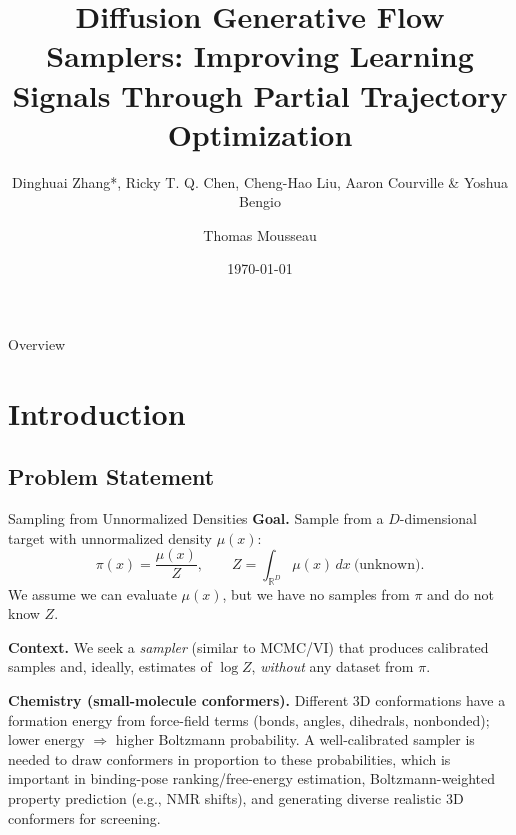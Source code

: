 \documentclass[aspectratio=169,xcolor=dvipsnames]{beamer}
\title{Diffusion Generative Flow Samplers: Improving Learning Signals Through Partial Trajectory Optimization}
\subtitle{Dinghuai Zhang*, Ricky T. Q. Chen, Cheng-Hao Liu, Aaron Courville \& Yoshua Bengio}
\author{Thomas Mousseau}
\date{\today} %
\begin{document}
\begin{frame}
    \vspace*{-2cm}
    \titlepage
\end{frame}

\begin{frame}{Overview}
    \tableofcontents
\end{frame}


\section{Introduction}

\subsection{Problem Statement}

\begin{frame}[t]{Sampling from Unnormalized Densities}
\footnotesize
\textbf{Goal.} Sample from a $D$-dimensional target with unnormalized density $\mu(x)$:
\[
\pi(x)=\frac{\mu(x)}{Z},\qquad Z=\int_{\mathbb R^D}\mu(x)\,dx\ \text{(unknown)}.
\]
We assume we can evaluate $\mu(x)$, but we have no samples from $\pi$ and do not know $Z$.

\vspace{0.1cm}

\medskip
\textbf{Context.} We seek a \emph{sampler} (similar to MCMC/VI) that produces calibrated samples and, ideally, estimates of $\log Z$, \emph{without} any dataset from $\pi$.

\vspace{0.3cm}


\textbf{Chemistry (small-molecule conformers).} Different 3D conformations have a formation energy from force-field terms (bonds, angles, dihedrals, nonbonded); lower energy $\Rightarrow$ higher Boltzmann probability. A well-calibrated sampler is needed to draw conformers in proportion to these probabilities, which is important in binding-pose ranking/free-energy estimation, Boltzmann-weighted property prediction (e.g., NMR shifts), and generating diverse realistic 3D conformers for screening.
\end{frame}
\end{document}
